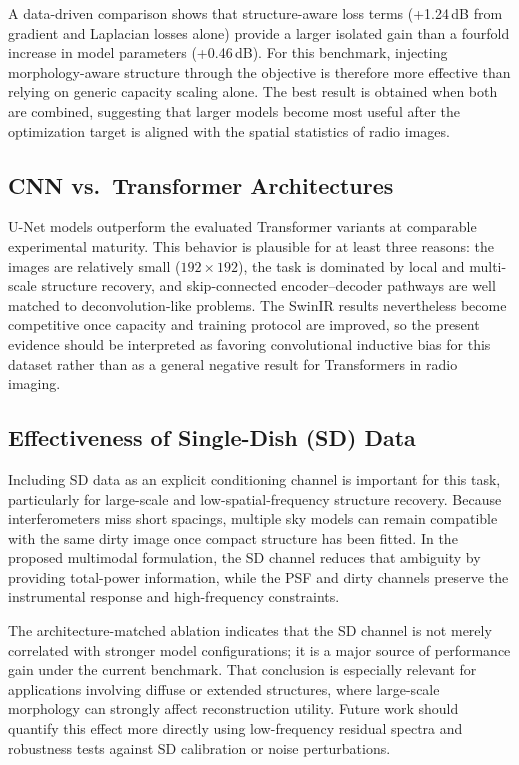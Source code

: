 \documentclass[twocolumn]{aastex631}
\begin{document}
A data-driven comparison shows that structure-aware loss terms (+1.24\,dB from gradient and Laplacian losses alone) provide a larger isolated gain than a fourfold increase in model parameters (+0.46\,dB).
For this benchmark, injecting morphology-aware structure through the objective is therefore more effective than relying on generic capacity scaling alone.
The best result is obtained when both are combined, suggesting that larger models become most useful after the optimization target is aligned with the spatial statistics of radio images.

\subsection{CNN vs.\ Transformer Architectures}

U-Net models outperform the evaluated Transformer variants at comparable experimental maturity.
This behavior is plausible for at least three reasons: the images are relatively small ($192 \times 192$), the task is dominated by local and multi-scale structure recovery, and skip-connected encoder--decoder pathways are well matched to deconvolution-like problems.
The SwinIR results nevertheless become competitive once capacity and training protocol are improved, so the present evidence should be interpreted as favoring convolutional inductive bias for this dataset rather than as a general negative result for Transformers in radio imaging.

\subsection{Effectiveness of Single-Dish (SD) Data}

Including SD data as an explicit conditioning channel is important for this task, particularly for large-scale and low-spatial-frequency structure recovery.
Because interferometers miss short spacings, multiple sky models can remain compatible with the same dirty image once compact structure has been fitted.
In the proposed multimodal formulation, the SD channel reduces that ambiguity by providing total-power information, while the PSF and dirty channels preserve the instrumental response and high-frequency constraints.

The architecture-matched ablation indicates that the SD channel is not merely correlated with stronger model configurations; it is a major source of performance gain under the current benchmark.
That conclusion is especially relevant for applications involving diffuse or extended structures, where large-scale morphology can strongly affect reconstruction utility.
Future work should quantify this effect more directly using low-frequency residual spectra and robustness tests against SD calibration or noise perturbations.
\end{document}
